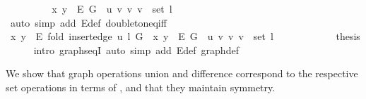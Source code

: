 \begin{isabellebody}
\ \ \ \ \isamarkupfalse%
\ \isamarkupfalse%
\ {\isachardoublequoteopen}{\isachardot}{\kern0pt}{\isachardot}{\kern0pt}{\isachardot}{\kern0pt}\ {\isasymlongleftrightarrow}\ {\isacharbraceleft}{\kern0pt}x{\isacharcomma}{\kern0pt}\ y{\isacharbraceright}{\kern0pt}\ {\isasymin}\ E\ G\ {\isasymunion}\ {\isacharbraceleft}{\kern0pt}{\isacharbraceleft}{\kern0pt}u{\isacharcomma}{\kern0pt}\ v{\isacharbraceright}{\kern0pt}\ {\isacharbar}{\kern0pt}v{\isachardot}{\kern0pt}\ v\ {\isasymin}\ set\ l{\isacharbraceright}{\kern0pt}{\isachardoublequoteclose}\isanewline
\ \ \ \ \ \ \isamarkupfalse%
\ {\isacharparenleft}{\kern0pt}auto\ simp\ add{\isacharcolon}{\kern0pt}\ E{\isacharunderscore}{\kern0pt}def\ doubleton{\isacharunderscore}{\kern0pt}eq{\isacharunderscore}{\kern0pt}iff{\isacharparenright}{\kern0pt}\isanewline
\ \ \ \ \isamarkupfalse%
\ \isamarkupfalse%
\ {\isachardoublequoteopen}{\isacharbraceleft}{\kern0pt}x{\isacharcomma}{\kern0pt}\ y{\isacharbraceright}{\kern0pt}\ {\isasymin}\ E\ {\isacharparenleft}{\kern0pt}fold\ {\isacharparenleft}{\kern0pt}insert{\isacharunderscore}{\kern0pt}edge\ u{\isacharparenright}{\kern0pt}\ l\ G{\isacharparenright}{\kern0pt}\ {\isasymlongleftrightarrow}\ {\isacharbraceleft}{\kern0pt}x{\isacharcomma}{\kern0pt}\ y{\isacharbraceright}{\kern0pt}\ {\isasymin}\ E\ G\ {\isasymunion}\ {\isacharbraceleft}{\kern0pt}{\isacharbraceleft}{\kern0pt}u{\isacharcomma}{\kern0pt}\ v{\isacharbraceright}{\kern0pt}\ {\isacharbar}{\kern0pt}v{\isachardot}{\kern0pt}\ v\ {\isasymin}\ set\ l{\isacharbraceright}{\kern0pt}{\isachardoublequoteclose}\isanewline
\ \ \ \ \ \ \isacommand{{\isachardot}{\kern0pt}}\isamarkupfalse%
\ \isacommand{{\isacharbraceright}{\kern0pt}}\isamarkupfalse%
\isanewline
\ \ \isamarkupfalse%
\ {\isacharquery}{\kern0pt}thesis\isanewline
\ \ \ \ \isamarkupfalse%
\ {\isacharparenleft}{\kern0pt}intro\ graphs{\isacharunderscore}{\kern0pt}eqI{\isacharparenright}{\kern0pt}\ {\isacharparenleft}{\kern0pt}auto\ simp\ add{\isacharcolon}{\kern0pt}\ E{\isacharunderscore}{\kern0pt}def\ graph{\isacharunderscore}{\kern0pt}def{\isacharparenright}{\kern0pt}\isanewline
{}\isamarkupfalse%
%
\endisatagproof
{\isafoldproof}%
%
\isadelimproof
%
\endisadelimproof
%
\begin{isamarkuptext}%
We show that graph operations union and difference correspond to the respective set operations in
terms of , and that they maintain symmetry.%
\end{isamarkuptext}\isamarkuptrue%

\end{isabellebody}
